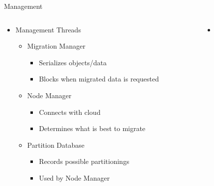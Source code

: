 \documentclass{beamer}
\begin{document}
\begin{frame}{Management}
\begin{columns}
\begin{column}{5cm}
\begin{itemize}
	\item Management Threads
	\begin{itemize}
		\item Migration Manager
		\begin{itemize}
			\item Serializes objects/data
			\item Blocks when migrated data is requested
		\end{itemize}
		\item Node Manager
		\begin{itemize}
			\item Connects with cloud
			\item Determines what is best to migrate
		\end{itemize}
		\item Partition Database
		\begin{itemize}
			\item Records possible partitionings
			\item Used by Node Manager
		\end{itemize}
	\end{itemize}
\end{itemize}
\end{column}
\begin{column}{5cm}
\begin{itemize}
	\begin{itemize}
		\item {}
	\end{itemize}
\end{itemize}
\end{column}
\end{columns}
\end{frame}
\end{document}
